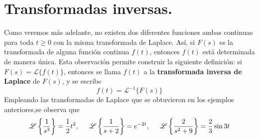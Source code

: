 \section{Transformadas inversas.}
Como veremos más adelante, no existen dos diferentes funciones ambas continuas para toda $t \geq 0$ con la misma transformada de Laplace. Así, si $F(s)$ es la transformada de alguna función continua $f(t)$, entonces $f(t)$ está determinada de manera única. Esta observación permite construir la siguiente definición: si $F(s) = \mathscr{L}
 \{ f(t) \}$, entonces se llama $f(t)$ a la \textbf{transformada inversa de Laplace} de $F(s)$, y se escribe
\begin{equation}
f(t) = \mathscr{L}^{-1} \{ F(s) \}
\label{eq:018}
\end{equation}
Empleando las transformadas de Laplace que se obtuvieron en los ejemplos anteriores,se observa que
\[ \mathscr{L} \left\lbrace \dfrac{1}{s^{3}} \right\rbrace = \dfrac{1}{2} t^{2}, \hspace{0.5cm} \mathscr{L} \left\lbrace \dfrac{1}{s + 2} \right\rbrace = e^{-2t}, \hspace{0.5cm} \mathscr{L} \left\lbrace \dfrac{2}{s^{2} + 9} \right\rbrace = \dfrac{2}{3} \sin 3t \]
